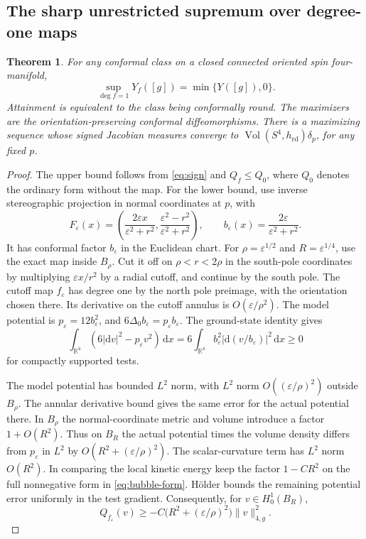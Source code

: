 \documentclass[11pt]{article}
\numberwithin{equation}{section}
\newtheorem{theorem}{Theorem}[section]
\DeclareMathOperator{\Vol}{Vol}
\newcommand{\rd}{\mathrm{rd}}
\newcommand{\dd}{\mathrm{d}}
\newcommand{\e}{\varepsilon}
\newcommand{\RR}{\mathbb{R}}
\newcommand{\abs}[1]{\lvert #1\rvert}
\newcommand{\norm}[1]{\lVert #1\rVert}
\newcommand{\Y}{Y([g])}
\newcommand{\Yf}{Y_f([g])}
\begin{document}
\subsection{The sharp unrestricted supremum over degree-one maps}

\begin{theorem}\label{thm:map-sup}
For any conformal class on a closed connected oriented spin four-manifold,
\[
 \sup_{\deg f=1}\Yf=\min\{\Y,0\}.
\]
Attainment is equivalent to the class being conformally round. The
maximizers are the orientation-preserving conformal diffeomorphisms.
There is a maximizing sequence whose signed Jacobian measures
converge to \(\Vol(S^4,h_{\rd})\delta_p\), for any fixed \(p\).
\end{theorem}

\begin{proof}
The upper bound follows from \eqref{eq:sign} and \(Q_f\le Q_0\),
where \(Q_0\) denotes the ordinary form without the map.
For the lower bound, use inverse stereographic projection in
normal coordinates at \(p\), with
\[
 F_\e(x)=\left(\frac{2\e x}{\e^2+r^2},
               \frac{\e^2-r^2}{\e^2+r^2}\right),\qquad
 b_\e(x)=\frac{2\e}{\e^2+r^2}.
\]
It has conformal factor \(b_\e\) in the Euclidean chart. For
\(\rho=\e^{1/2}\) and \(R=\e^{1/4}\), use the exact map inside
\(B_\rho\). Cut it off on \(\rho<r<2\rho\) in the south-pole coordinates
by multiplying \(\e x/r^2\) by a radial cutoff, and continue by
the south pole. The cutoff map \(f_\e\) has degree one by the north
pole preimage, with the orientation chosen there. Its derivative
on the cutoff annulus is \(O(\e/\rho^2)\).
The model potential is \(p_\e=12b_\e^2\), and
\(6\Delta_0b_\e=p_\e b_\e\). The ground-state identity gives
\begin{equation}\label{eq:bubble-form}
 \int_{\RR^4}(6\abs{\dd v}^2-p_\e v^2)\,\dd x
   =6\int_{\RR^4}b_\e^2\abs{\dd(v/b_\e)}^2\,\dd x\ge0
\end{equation}
for compactly supported tests.

The model potential has bounded \(L^2\) norm, with
\(L^2\) norm \(O((\e/\rho)^2)\) outside \(B_\rho\).
The annular derivative bound gives the same error for the actual
potential there. In \(B_\rho\) the normal-coordinate metric and
volume introduce a factor \(1+O(R^2)\). Thus on \(B_R\) the
actual potential times the volume density differs from \(p_\e\)
in \(L^2\) by \(O(R^2+(\e/\rho)^2)\). The scalar-curvature term
has \(L^2\) norm \(O(R^2)\). In comparing the local kinetic energy
keep the factor \(1-CR^2\) on the full nonnegative form in
\eqref{eq:bubble-form}. H\"older bounds the remaining potential
error uniformly in the test gradient. Consequently, for
\(v\in H^1_0(B_R)\),
\begin{equation}\label{eq:local-bubble}
 Q_{f_\e}(v)\ge -C\bigl(R^2+(\e/\rho)^2\bigr)\norm v_{4,g}^2 .
\end{equation}


\end{proof}
\end{document}
